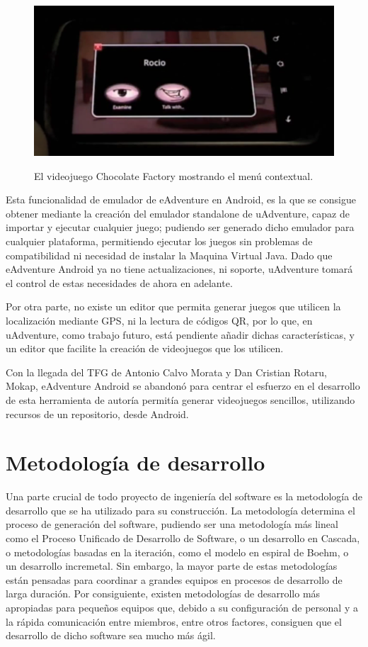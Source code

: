 \begin{figure}[htb]
	\includegraphics[height=2.5in]{figures/eandroid-menu.png}
	\caption[eAdventure Android - Menu]{El videojuego Chocolate Factory mostrando el menú contextual.}
	\label{eandroidmenu}
\end{figure}

Esta funcionalidad de emulador de eAdventure en Android, es la que se consigue obtener mediante la creación del emulador standalone de uAdventure, capaz de importar y ejecutar cualquier juego; pudiendo ser generado dicho emulador para cualquier plataforma, permitiendo ejecutar los juegos sin problemas de compatibilidad ni necesidad de instalar la Maquina Virtual Java. Dado que eAdventure Android ya no tiene actualizaciones, ni soporte, uAdventure tomará el control de estas necesidades de ahora en adelante.

Por otra parte, no existe un editor que permita generar juegos que utilicen la localización mediante GPS, ni la lectura de códigos QR, por lo que, en uAdventure, como trabajo futuro, está pendiente añadir dichas características, y un editor que facilite la creación de videojuegos que los utilicen. 

Con la llegada del TFG de Antonio Calvo Morata y Dan Cristian Rotaru, Mokap, eAdventure Android se abandonó para centrar el esfuerzo en el desarrollo de esta herramienta de autoría permitía generar videojuegos sencillos, utilizando recursos de un repositorio, desde Android. 

\section{Metodología de desarrollo}
\label{metodologiadedesarrollo}

Una parte crucial de todo proyecto de ingeniería del software es la metodología de desarrollo que se ha utilizado para su construcción. La metodología determina el proceso de generación del software, pudiendo ser una metodología más lineal como el Proceso Unificado de Desarrollo de Software, o un desarrollo en Cascada, o metodologías basadas en la iteración, como el modelo en espiral de Boehm, o un desarrollo incremetal. Sin embargo, la mayor parte de estas metodologías están pensadas para coordinar a grandes equipos en procesos de desarrollo de larga duración. Por consiguiente, existen metodologías de desarrollo más apropiadas para pequeños equipos que, debido a su configuración de personal y a la rápida comunicación entre miembros, entre otros factores, consiguen que el desarrollo de dicho software sea mucho más ágil.


